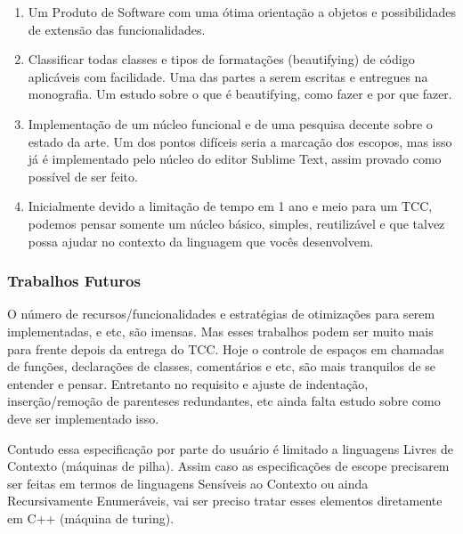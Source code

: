 \begin{englishtext}
    \begin{enumerate}[leftmargin=*]

        \item

        Um Produto de Software com uma ótima orientação a objetos e possibilidades de extensão das
        funcionalidades.

        \item

        Classificar todas classes e tipos de formatações (beautifying) de código aplicáveis com
        facilidade. Uma das partes a serem escritas e entregues na monografia. Um estudo sobre o que
        é beautifying, como fazer e por que fazer.

        \item

        Implementação de um núcleo funcional e de uma pesquisa decente sobre o estado da arte. Um
        dos pontos difíceis seria a marcação dos escopos, mas isso já é implementado pelo núcleo do
        editor Sublime Text, assim provado como possível de ser feito.

        \item

        Inicialmente devido a limitação de tempo em 1 ano e meio para um TCC, podemos pensar somente
        um núcleo básico, simples, reutilizável e que talvez possa ajudar no contexto da linguagem
        que vocês desenvolvem.

    \end{enumerate}


\subsubsection{Trabalhos Futuros}

    O número de recursos/funcionalidades e estratégias de otimizações para serem implementadas, e
    etc, são imensas. Mas esses trabalhos podem ser muito mais para frente depois da entrega do TCC.
    Hoje o controle de espaços em chamadas de funções, declarações de classes, comentários e etc,
    são mais tranquilos de se entender e pensar. Entretanto no requisito e ajuste de indentação,
    inserção/remoção de parenteses redundantes, etc ainda falta estudo sobre como deve ser
    implementado isso.

    Contudo essa especificação por parte do usuário é limitado a linguagens Livres de Contexto
    (máquinas de pilha). Assim caso as especificações de escope precisarem ser feitas em termos de
    linguagens Sensíveis ao Contexto ou ainda Recursivamente Enumeráveis, vai ser preciso tratar
    esses elementos diretamente em C++ (máquina de turing).


\end{englishtext}
